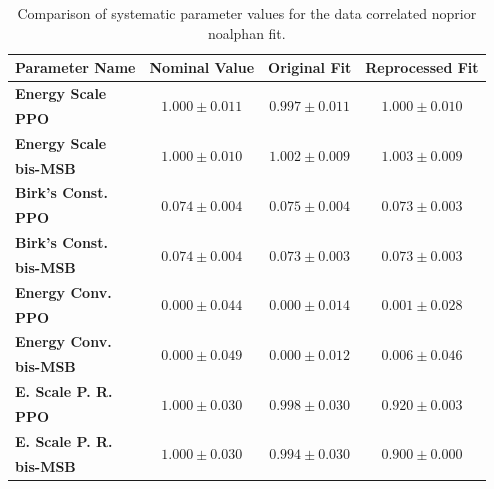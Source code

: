 \begin{table}
    \small
    \centering
    \caption{Comparison of systematic parameter values for the data correlated noprior noalphan fit.}
    \label{tab:data_correlated_noprior_noalphan_syst_old_new}
    \begin{tabular}{lccc}
        \hline\hline
        \textbf{Parameter Name} & \textbf{Nominal Value} & \textbf{Original Fit} & \textbf{Reprocessed Fit} \\
        \hline

        \textbf{Energy Scale} & \multirow{2}{*}{$1.000\pm0.011$} & \multirow{2}{*}{$0.997\pm0.011$} & \multirow{2}{*}{$1.000\pm0.010$} \\
        \textbf{PPO} & & & \\
        \hline

        \textbf{Energy Scale} & \multirow{2}{*}{$1.000\pm0.010$} & \multirow{2}{*}{$1.002\pm0.009$} & \multirow{2}{*}{$1.003\pm0.009$} \\
        \textbf{bis-MSB} & & & \\
        \hline

        \textbf{Birk's Const.} & \multirow{2}{*}{$0.074\pm0.004$} & \multirow{2}{*}{$0.075\pm0.004$} & \multirow{2}{*}{$0.073\pm0.003$} \\
        \textbf{PPO} & & & \\
        \hline

        \textbf{Birk's Const.} & \multirow{2}{*}{$0.074\pm0.004$} & \multirow{2}{*}{$0.073\pm0.003$} & \multirow{2}{*}{$0.073\pm0.003$} \\
        \textbf{bis-MSB} & & & \\
        \hline

        \textbf{Energy Conv.} & \multirow{2}{*}{$0.000\pm0.044$} & \multirow{2}{*}{$0.000\pm0.014$} & \multirow{2}{*}{$0.001\pm0.028$} \\
        \textbf{PPO} & & & \\
        \hline

        \textbf{Energy Conv.} & \multirow{2}{*}{$0.000\pm0.049$} & \multirow{2}{*}{$0.000\pm0.012$} & \multirow{2}{*}{$0.006\pm0.046$} \\
        \textbf{bis-MSB} & & & \\
        \hline

        \textbf{E. Scale P. R.} & \multirow{2}{*}{$1.000\pm0.030$} & \multirow{2}{*}{$0.998\pm0.030$} & \multirow{2}{*}{$0.920\pm0.003$} \\
        \textbf{PPO} & & & \\
        \hline

        \textbf{E. Scale P. R.} & \multirow{2}{*}{$1.000\pm0.030$} & \multirow{2}{*}{$0.994\pm0.030$} & \multirow{2}{*}{$0.900\pm0.000$} \\
        \textbf{bis-MSB} & & & \\
        \hline

        \hline\hline
    \end{tabular}
\end{table}
